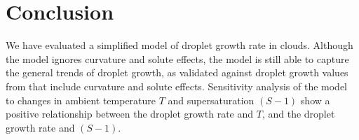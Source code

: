 \documentclass[]{article}
\begin{document}
\section{Conclusion}
We have evaluated a simplified model of droplet growth rate in clouds.
Although the model ignores curvature and solute effects, the model is still
able to capture the general trends of droplet growth, as validated against
droplet growth values from \cite{Curry, Mason, Best} that include curvature and
solute effects. Sensitivity analysis of the model to changes in ambient temperature $T$
and supersaturation $(S -1)$ show a positive relationship between the droplet growth rate
and $T$, and the droplet growth rate and $(S - 1)$.





\end{document}
